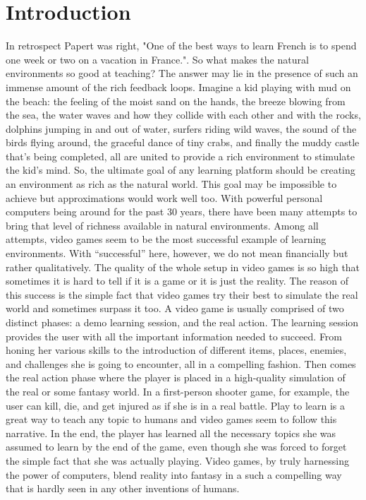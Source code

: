 \documentclass[12pt, a4paper]{article}
\begin{document}
\section*{Introduction}
In retrospect Papert was right, "One of the best ways to learn French is to spend one week or two on a vacation in France."\cite{papert}. So what makes the natural environments so good at teaching? The answer may lie in the presence of such an immense amount of the rich feedback loops. Imagine a kid playing with mud on the beach: the feeling of the moist sand on the hands, the breeze blowing from the sea, the water waves and how they collide with each other and with the rocks, dolphins jumping in and out of water, surfers riding wild waves, the sound of the birds flying around, the graceful dance of tiny crabs, and finally the muddy castle that's being completed, all are united to provide a rich environment to stimulate the kid's mind. So, the ultimate goal of any learning platform should be creating an environment as rich as the natural world. This goal may be impossible to achieve but approximations would work well too. With powerful personal computers being around for the past 30 years, there have been many attempts to bring that level of richness available in natural environments. Among all attempts, video games seem to be the most successful example of learning environments. With “successful” here, however, we do not mean financially but rather qualitatively. The quality of the whole setup in video games is so high that sometimes it is hard to tell if it is a game or it is just the reality. The reason of this success is the simple fact that video games try their best to simulate the real world and sometimes surpass it too. A video game is usually comprised of two distinct phases: a demo learning session, and the real action. The learning session provides the user with all the important information needed to succeed. From honing her various skills to the introduction of different items, places, enemies, and challenges she is going to encounter, all in a compelling fashion. Then comes the real action phase where the player is placed in a high-quality simulation of the real or some fantasy world. In a first-person shooter game, for example, the user can kill, die, and get injured as if she is in a real battle. Play to learn is a great way to teach any topic to humans and video games seem to follow this narrative. In the end, the player has learned all the necessary topics she was assumed to learn by the end of the game, even though she was forced to forget the simple fact that she was actually playing. Video games, by truly harnessing the power of computers, blend reality into fantasy in a such a compelling way that is hardly seen in any other inventions of humans.
\end{document}
